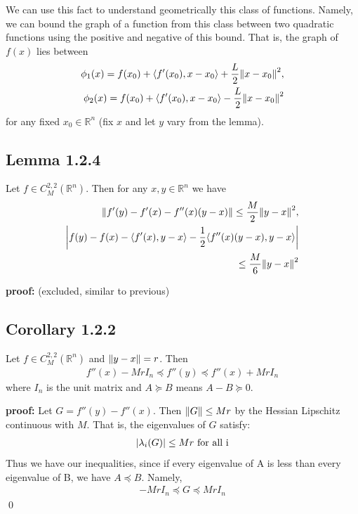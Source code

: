\documentclass[12pt,a4paper]{article}
\begin{document}
	We can use this fact to understand geometrically this class of functions. Namely, we can bound the graph of a function from this class between two quadratic functions using the positive and negative of this bound. That is, the graph of $f(x)$ lies between
	\begin{align*}
		\phi_1(x) = f(x_0) + \langle f'(x_0), x - x_0 \rangle + \frac{L}{2}\norm{x - x_0}^2, \\
		\phi_2(x) = f(x_0) + \langle f'(x_0), x - x_0 \rangle - \frac{L}{2}\norm{x - x_0}^2
	\end{align*}
	for any fixed $x_0 \in \mathbb{R}^n$ (fix $x$ and let $y$ vary from the lemma).
	
	
	\subsection*{Lemma 1.2.4}\label{lem124}
	Let $f \in C_M^{2,2}(\mathbb{R}^n)$. Then for any $x,y \in \mathbb{R}^n$ we have
	\begin{align*}
		\norm{f'(y) - f'(x) - f''(x)(y-x)} \leq \frac{M}{2}\norm{y-x}^2, \\
		\abs{f(y) - f(x) - \langle f'(x), y-x \rangle - \frac{1}{2}\langle f''(x)(y-x), y-x \rangle } \\
		\leq \frac{M}{6}\norm{y-x}^2
	\end{align*}
	
	\textbf{proof:} (excluded, similar to previous)
	
	\subsection*{Corollary 1.2.2}\label{cor122}
	Let $f \in C_M^{2,2}(\mathbb{R}^n)$ and $\norm{y-x} = r$. Then 
	\begin{align*}
		f''(x) - MrI_n \preceq f''(y) \preceq f''(x) + MrI_n
	\end{align*}
	where $I_n$ is the unit matrix and $A \succeq B$ means $A-B \succeq 0$.
	
	\textbf{proof:}
	Let $G=f''(y) - f''(x)$. Then $\norm{G}\leq Mr$ by the Hessian Lipschitz continuous with $M$. That is, the eigenvalues of $G$ satisfy:
	\begin{align*}
		\abs{\lambda_i(G)}\leq Mr \text{  for all i}
	\end{align*}
	Thus we have our inequalities, since if every eigenvalue of A is less than every eigenvalue of B, we have $A\preceq B$. Namely,
	\begin{align*}
		-MrI_n \preceq G \preceq MrI_n
	\end{align*}
	\qed
	
\end{document}
